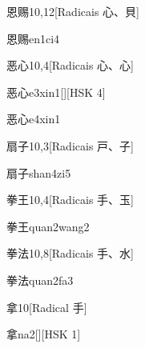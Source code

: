 \begin{entry}{恩赐}{10,12}[Radicais ⼼、⾙]
  \begin{phonetics}{恩赐}{en1ci4}
  \end{phonetics}
\end{entry}

\begin{entry}{恶心}{10,4}[Radicais ⼼、⼼]
  \begin{phonetics}{恶心}{e3xin1}[][HSK 4]
  \end{phonetics}
  \begin{phonetics}{恶心}{e4xin1}
  \end{phonetics}
\end{entry}

\begin{entry}{扇子}{10,3}[Radicais ⼾、⼦]
  \begin{phonetics}{扇子}{shan4zi5}
  \end{phonetics}
\end{entry}

\begin{entry}{拳王}{10,4}[Radicais ⼿、⽟]
  \begin{phonetics}{拳王}{quan2wang2}
  \end{phonetics}
\end{entry}

\begin{entry}{拳法}{10,8}[Radicais ⼿、⽔]
  \begin{phonetics}{拳法}{quan2fa3}
  \end{phonetics}
\end{entry}

\begin{entry}{拿}{10}[Radical ⼿]
  \begin{phonetics}{拿}{na2}[][HSK 1]
  \end{phonetics}
\end{entry}

